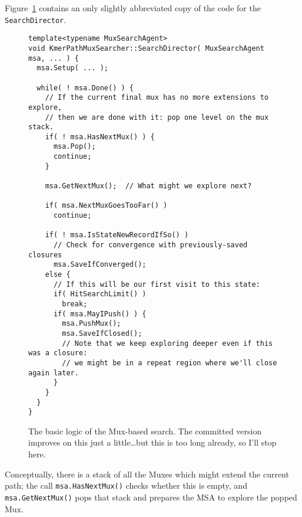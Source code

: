 \documentclass[11pt]{article}
\begin{document}
Figure~\ref{fig_search_director} contains an only slightly abbreviated copy of
the code for the {\tt SearchDirector}.
\begin{figure}
\small
\begin{verbatim}
template<typename MuxSearchAgent>
void KmerPathMuxSearcher::SearchDirector( MuxSearchAgent msa, ... ) {
  msa.Setup( ... );

  while( ! msa.Done() ) {
    // If the current final mux has no more extensions to explore,
    // then we are done with it: pop one level on the mux stack.
    if( ! msa.HasNextMux() ) {
      msa.Pop();
      continue;
    }

    msa.GetNextMux();  // What might we explore next?
    
    if( msa.NextMuxGoesTooFar() )
      continue;

    if( ! msa.IsStateNewRecordIfSo() )
      // Check for convergence with previously-saved closures
      msa.SaveIfConverged();
    else {
      // If this will be our first visit to this state:
      if( HitSearchLimit() )
        break;
      if( msa.MayIPush() ) {
        msa.PushMux();
        msa.SaveIfClosed();
        // Note that we keep exploring deeper even if this was a closure:
        // we might be in a repeat region where we'll close again later.
      }
    }
  }
}
\end{verbatim}
\caption{The basic logic of the Mux-based search.  The committed
version improves on this just a little\ldots but this is too long already, so I'll stop here.}
\label{fig_search_director}
\end{figure}
Conceptually, there is a stack of all the Muxes which might extend the current path;
the call \verb"msa.HasNextMux()" checks whether this is empty, and
\verb"msa.GetNextMux()" pops that stack and prepares the MSA to explore
the popped Mux.
\end{document}
